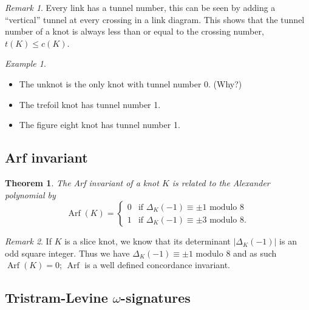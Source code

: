 \documentclass[nobib]{tufte-book} %
\newtheorem{theorem}{Theorem}
\theoremstyle{definition}
\theoremstyle{remark}
\newtheorem{remark}{Remark}
\newtheorem{example}{Example}
\DeclareMathOperator{\Arf}{Arf}
\begin{document}
\begin{remark}
	Every link has a tunnel number, this can be seen by adding a ``vertical''
	tunnel at every crossing in a link diagram.
	This shows that the tunnel number of a knot is always less than or equal
	to the crossing number, $t(K) \le c(K)$.
\end{remark}

\begin{example}
	\begin{itemize}
		\item The unknot is the only knot with tunnel number 0. (Why?)
		\item The trefoil knot has tunnel number 1.
		\item The figure eight knot has tunnel number 1.
	\end{itemize}
\end{example}



\subsection{Arf invariant}

\begin{theorem}
	The Arf invariant of a knot $K$ is related to the Alexander polynomial by
	\begin{equation*}
		\Arf(K) =
		\begin{cases}
			0 & \textrm{if } \Delta_{K}(-1) \equiv \pm 1 \textrm{ modulo } 8 \\
			1 & \textrm{if } \Delta_{K}(-1) \equiv \pm 3 \textrm{ modulo } 8.
		\end{cases}
	\end{equation*}
\end{theorem}

\begin{remark}
	If $K$ is a slice knot, we know that its determinant
	$| \Delta_{K}(-1) |$ is an odd square integer.
	Thus we have $\Delta_{K}(-1) \equiv \pm 1 \textrm{ modulo } 8$
	and as such $\Arf(K) = 0$; $\Arf$ is a well defined concordance invariant.
\end{remark}


\subsection{Tristram-Levine $\omega$-signatures}
\end{document}
